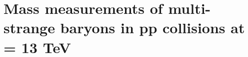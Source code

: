 \chapter{Mass measurements of multi-strange baryons in pp collisions at \sqrtS = 13 TeV}
\label{sec:Section03}
